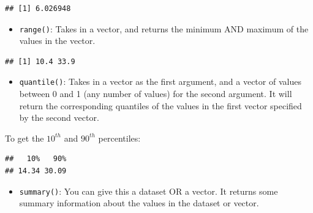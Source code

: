 \documentclass[
]{book}
\newenvironment{Shaded}{\begin{snugshade}}{\end{snugshade}}
\newcommand{\FloatTok}[1]{\textcolor[rgb]{0.00,0.00,0.81}{#1}}
\newcommand{\KeywordTok}[1]{\textcolor[rgb]{0.13,0.29,0.53}{\textbf{#1}}}
\newcommand{\NormalTok}[1]{#1}
\newcommand{\OperatorTok}[1]{\textcolor[rgb]{0.81,0.36,0.00}{\textbf{#1}}}
\providecommand{\tightlist}{%
  \setlength{\itemsep}{0pt}\setlength{\parskip}{0pt}}
\begin{document}
\begin{verbatim}
## [1] 6.026948
\end{verbatim}

\begin{itemize}
\tightlist
\item
  \texttt{range()}: Takes in a vector, and returns the minimum AND maximum of the values in the vector.
\end{itemize}

\begin{Shaded}
\end{Shaded}

\begin{verbatim}
## [1] 10.4 33.9
\end{verbatim}

\begin{itemize}
\tightlist
\item
  \texttt{quantile()}: Takes in a vector as the first argument, and a vector of values between 0 and 1 (any number of values) for the second argument. It will return the corresponding quantiles of the values in the first vector specified by the second vector.
\end{itemize}

To get the \(10^{th}\) and \(90^{th}\) percentiles:

\begin{Shaded}
\end{Shaded}

\begin{verbatim}
##   10%   90% 
## 14.34 30.09
\end{verbatim}

\begin{itemize}
\tightlist
\item
  \texttt{summary()}: You can give this a dataset OR a vector. It returns some summary information about the values in the dataset or vector.
\end{itemize}

\begin{Shaded}
\end{Shaded}
\end{document}
